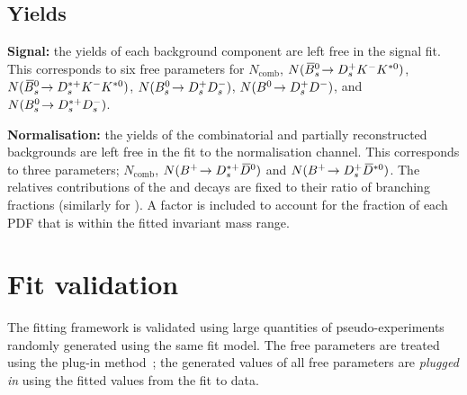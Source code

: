 \subsection{Yields}
\begin{description}
\item \textbf{Signal:} the yields of each background component are left free in the signal fit. This corresponds to six free parameters for $N_{\text{comb}}$, $N({{\kern 0.18em\overline{\kern -0.18em B}{}}{}^0_{s}}\!\rightarrow {\ensuremath{{D}^+_{s}}}{\ensuremath{{K}^-}}{\ensuremath{{K}^{*0}}})$, $N({{\kern 0.18em\overline{\kern -0.18em B}{}}{}^0_{s}}\!\rightarrow {\ensuremath{{D}^{*+}_{s}}}{\ensuremath{{K}^-}}{\ensuremath{{K}^{*0}}})$, $N({{B}^0_{s}}\!\rightarrow {\ensuremath{{D}^+_{s}}}{\ensuremath{{D}^-_{s}}})$, $N({{B}^0}\!\rightarrow {\ensuremath{{D}^+_{s}}}{\ensuremath{{D}^-}})$, and $N({{B}^0_{s}}\!\rightarrow {\ensuremath{{D}^{*+}_{s}}}{\ensuremath{{D}^-_{s}}})$.

\item \textbf{Normalisation:} the yields of the combinatorial and partially reconstructed backgrounds are left free in the fit to the normalisation channel. This corresponds to three parameters; $N_{\text{comb}}$, $N({{{B}^+}}\!\rightarrow {\ensuremath{{D}^{*+}_{s}}}{\ensuremath{{\kern 0.2em\overline{\kern -0.2em D}{}}{}^0}})$ and $N({{{B}^+}}\!\rightarrow {\ensuremath{{D}^+_{s}}}{\ensuremath{{\kern 0.2em\overline{\kern -0.2em D}{}}{}^{*0}}})$. The relatives contributions of the \decay{\Dssp}{\Dsp\piz} and \decay{\Dssp}{\Dsp\Pgamma} decays are fixed to their ratio of branching fractions (similarly for \Dstarzb). A factor is included to account for the fraction of each PDF that is within the fitted \Bp invariant mass range.
\end{description}




\section{Fit validation}
\label{sec:B2DsKK_fitvalidation}

The fitting framework is validated using large quantities of pseudo-experiments randomly generated using the same fit model. The free parameters are treated using the plug-in method~\cite{plugin}; the generated values of all free parameters are \emph{plugged in} using the fitted values from the fit to data.      

